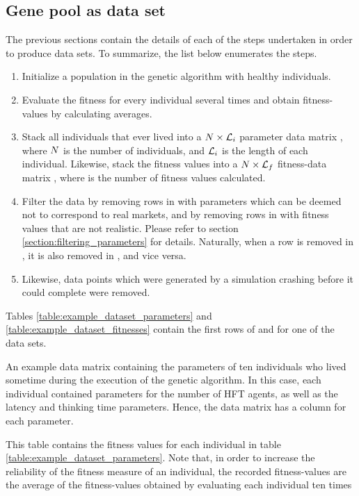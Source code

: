\subsection{Gene pool as data set}\label{section:gene_pool_as_data_set}
The previous sections contain the details of each of the steps undertaken in order to produce data sets. To summarize, the list below enumerates the steps.
\begin{enumerate}
\item Initialize a population in the genetic algorithm with healthy individuals.
\item Evaluate the fitness for every individual several times and obtain fitness-values by calculating averages.
\item Stack all individuals that ever lived into a $N \times \mathcal{L}_i$ parameter data matrix \datamatrixpar, where $N$ is the number of individuals, and $\mathcal{L}_i$ is the length of each individual. Likewise, stack the fitness values into a $N \times \mathcal{L}_f$ fitness-data matrix \datamatrixfit, where \fitnesslength is the number of fitness values calculated. 
\item Filter the data by removing rows in \datamatrixpar with parameters which can be deemed not to correspond to real markets, and by removing rows in \datamatrixfit with fitness values that are not realistic. Please refer to section \ref{section:filtering_parameters} for details. Naturally, when a row is removed in \datamatrixpar, it is also removed in \datamatrixfit, and vice versa. 
\item Likewise, data points which were generated by a simulation crashing before it could complete were removed.
\end{enumerate}
Tables \ref{table:example_dataset_parameters} and \ref{table:example_dataset_fitnesses} contain the first rows of \datamatrixpar and \datamatrixfit for one of the data sets.
\begin{table}
\centering
\scriptsize

\caption{An example data matrix containing the parameters of ten individuals who lived sometime during the execution of the genetic algorithm. In this case, each individual contained parameters for the number of HFT agents, as well as the latency and thinking time parameters. Hence, the data matrix has a column for each parameter.}
\label{table:example_dataset_parameters}
\end{table}

\begin{table}
\centering

\caption{This table contains the fitness values for each individual in table \ref{table:example_dataset_parameters}. Note that, in order to increase the reliability of the fitness measure of an individual, the recorded fitness-values are the average of the fitness-values obtained by evaluating each individual ten times}
\label{table:example_dataset_fitnesses}
\end{table}


